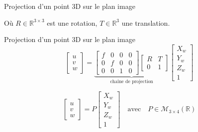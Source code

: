 \begin{frame}{Projection d’un point 3D sur le plan image}
\begin{minipage}[c]{0.48\linewidth}
\begin{overlayarea}{\linewidth}{5cm}
{      Où $R \in \mathbb{R}^{3\times3}$ est une rotation, $T \in \mathbb{R}^3$ une translation.
    }
  \end{overlayarea}
\end{minipage}
\hfill
\begin{minipage}[c]{0.48\linewidth}
  \centering
  \begin{overlayarea}{0.9\linewidth}{4cm}
    \hspace*{-1cm}
    \begin{tikzpicture}[x=0.75pt,y=0.75pt,yscale=-1,xscale=1, scale=0.6]
      
    \end{tikzpicture}
  \end{overlayarea}
\end{minipage}
\end{frame}


\begin{frame}{Projection d’un point 3D sur le plan image}
  \centering
  \[
    \begin{bmatrix}
    u \\ v \\ w
    \end{bmatrix}
    =
    \underbrace{
    \begin{bmatrix}
    f & 0 & 0 & 0 \\
    0 & f & 0 & 0 \\
    0 & 0 & 1 & 0
    \end{bmatrix}
    \begin{bmatrix}
    R & T \\
    0 & 1
    \end{bmatrix}
    }_{\text{chaîne de projection}}
    \begin{bmatrix}
    X_w \\ Y_w \\ Z_w \\ 1
    \end{bmatrix}
  \]
  
  \pause
  \[
    \begin{bmatrix}
    u \\ v \\ w
    \end{bmatrix}
    =
    P
    \begin{bmatrix}
    X_w \\ Y_w \\ Z_w \\ 1
    \end{bmatrix}
    \quad \text{avec} \quad
    P \in \mathcal{M}_{3 \times 4}(\mathbb{R})
  \]
\end{frame}



